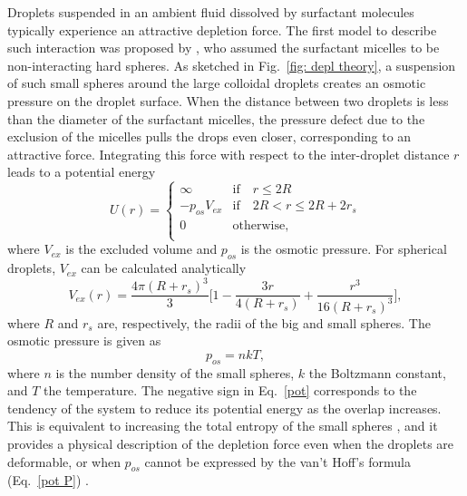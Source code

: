 Droplets suspended in an ambient fluid dissolved by surfactant molecules typically experience an attractive depletion force. The first model to describe such interaction was proposed by  \cite{Asakura_Oosawa}, who assumed the surfactant micelles to be non-interacting hard spheres. As sketched in Fig.\ \ref{fig: depl theory}, a suspension of such small spheres around the large colloidal droplets creates an osmotic pressure on the droplet surface. When the distance between two droplets is less than the diameter of the surfactant micelles, the pressure defect due to the exclusion of the micelles pulls the drops even closer, corresponding to an attractive force. Integrating this force with respect to the inter-droplet distance $r$ leads to a potential energy
\begin{equation}
    U(r)=
    \begin{cases}
        \infty & \textrm{if} \quad r \leqslant 2R \\
        - p_{os}V_{ex} & \textrm{if} \quad 2R < r \leqslant 2R+2r_s  \\
        0 \quad & \textrm{otherwise}, \\
    \end{cases}
    \label{pot}
\end{equation}
where $V_{ex}$ is the excluded volume and $p_{os}$ is the osmotic pressure. For spherical droplets, $V_{ex}$ can be calculated analytically
\begin{equation}
    V_{ex}(r) = \frac{4\pi (R+r_s)^3}{3}\bigg[ 1- \frac{3r}{4(R+r_s)}+\frac{r^3}{16(R+r_s)^3} \bigg],
    \label{pot V}
\end{equation}
where $R$ and $r_s$ are, respectively, the radii of the big and small spheres. The osmotic pressure is given as
\begin{equation}
    p_{os} = nkT,
    \label{pot P}
\end{equation}
where $n$ is the number density of the small spheres, $k$ the Boltzmann constant, and $T$ the temperature. The negative sign in Eq.\ \eqref{pot} corresponds to the tendency of the system to reduce its potential energy as the overlap increases. This is equivalent to increasing the total entropy of the small spheres \citep{Melby_PRL_2007}, and it provides a physical description of the depletion force even when the droplets are deformable, or when $p_{os}$ cannot be expressed by the van't Hoff's formula (Eq.\ \eqref{pot P}) \citep{Asakura_Oosawa}.

